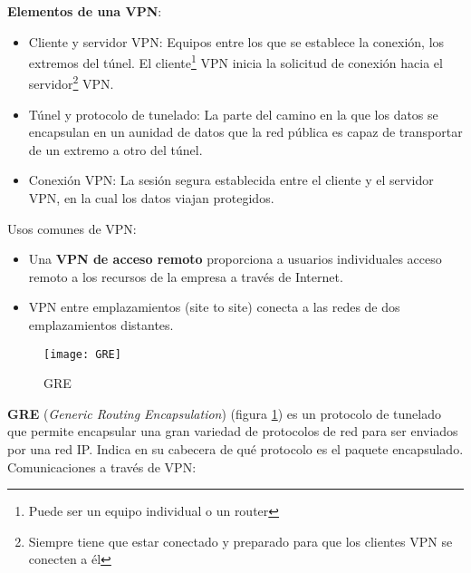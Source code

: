 \documentclass[10pt,portrait, twocolumn]{article}
\begin{document}
\textbf{Elementos de una VPN}:
	\begin{itemize}
	\item Cliente y servidor VPN: Equipos entre los que se establece la conexión, los extremos del túnel. El cliente\footnote{Puede ser un equipo individual o un router} VPN inicia la solicitud de conexión hacia el servidor\footnote{Siempre tiene que estar conectado y preparado para que los clientes VPN se conecten a él} VPN.
	\item Túnel y protocolo de tunelado: La parte del camino en la que los datos se encapsulan en un aunidad de datos que la red pública es capaz de transportar de un extremo a otro del túnel.
	\item Conexión VPN: La sesión segura establecida entre el cliente y el servidor VPN, en la cual los datos viajan protegidos.
	\end{itemize}
	
Usos comunes de VPN:

	\begin{itemize}
	\item Una \textbf{VPN de acceso remoto} proporciona a usuarios individuales acceso remoto a los recursos de la empresa a través de Internet.
	\item VPN entre emplazamientos (site to site) conecta a las redes de dos emplazamientos distantes.
	\end{itemize}	
	
\begin{figure}[!ht]	
	\centering
    	\texttt{[image: GRE]}
	\caption{GRE}
	\label{fig:GRE}
\end{figure} 

	
	
\textbf{GRE} (\textit{Generic Routing Encapsulation})  (figura \ref{fig:GRE}) es un protocolo de tunelado que permite encapsular una gran variedad de protocolos de red para ser enviados por una red IP. Indica en su cabecera de qué protocolo es el paquete encapsulado.\\

Comunicaciones a través de VPN:
\end{document}
